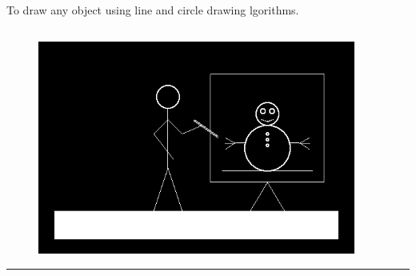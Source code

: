 \documentclass[12pt,letterpaper]{article}
\begin{document}
\newpage

\subsection*{}
\begin{flushleft}
     To draw any object using line and circle drawing lgorithms.  
\end{flushleft}

\subsection*{}
\begin{flushleft}




\end{flushleft}
\newpage
\subsection*{}
\begin{figure}[h]
    \centering
    \includegraphics[height=7cm]{Figure/Outputs/OP.png}
\end{figure}

\bigskip\bigskip
\hrule
\end{document}
